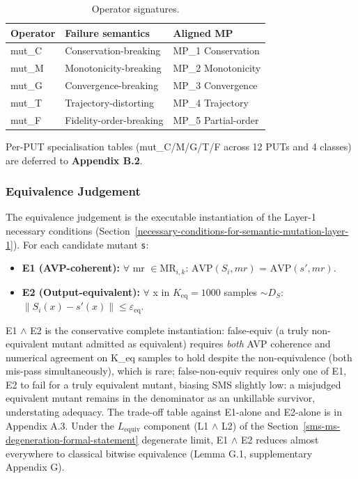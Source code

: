 \documentclass[manuscript,screen,review]{acmart}
\begin{document}
\begin{table}[t]
\caption{Operator signatures.}\label{tab:p2-01}
\centering
\begin{tabular}{@{}lll@{}}
\toprule
Operator & Failure semantics & Aligned MP \\
\midrule
mut\_C & Conservation-breaking & MP\_1 Conservation \\
mut\_M & Monotonicity-breaking & MP\_2 Monotonicity \\
mut\_G & Convergence-breaking & MP\_3 Convergence \\
mut\_T & Trajectory-distorting & MP\_4 Trajectory \\
mut\_F & Fidelity-order-breaking & MP\_5 Partial-order \\
\bottomrule
\end{tabular}
\end{table}

Per-PUT specialisation tables (mut\_C/M/G/T/F across 12 PUTs and 4
classes) are deferred to \textbf{Appendix B.2}.

\subsubsection{Equivalence Judgement}\label{equivalence-judgement-e1-e2-layer-2}

The equivalence judgement is the executable instantiation of the Layer-1
necessary conditions (Section~\ref{necessary-conditions-for-semantic-mutation-layer-1}). For each candidate mutant
\texttt{s\textquotesingle{}}:

\begin{itemize}

\item
  \textbf{E1 (AVP-coherent):} $\forall$ mr $\in \mathrm{MR}_{i,k}$: $\mathrm{AVP}(S_i, mr)$ =
  $\mathrm{AVP}(s', mr)$.
\item
  \textbf{E2 (Output-equivalent):} $\forall$ x in $K_{\mathrm{eq}}=1000$ samples
  $\sim D_S$: $\|S_i(x) - s'(x)\| \leq \varepsilon_{\mathrm{eq}}$.
\end{itemize}

E1 $\wedge$ E2 is the conservative complete instantiation: false-equiv (a
truly non-equivalent mutant admitted as equivalent) requires \emph{both}
AVP coherence and numerical agreement on K\_eq samples to hold despite the
non-equivalence (both mis-pass simultaneously), which is rare;
false-non-equiv requires only one of E1, E2 to fail for a truly equivalent
mutant, biasing SMS slightly low: a misjudged equivalent mutant remains in
the denominator as an unkillable survivor, understating adequacy. The
trade-off table against
E1-alone and E2-alone is in Appendix A.3. Under the $L_{\mathrm{equiv}}$
component (L1 $\wedge$ L2) of the Section~\ref{sms-ms-degeneration-formal-statement} degenerate
limit, E1 $\wedge$ E2 reduces almost everywhere to classical bitwise
equivalence (Lemma G.1, supplementary Appendix G).
\end{document}
